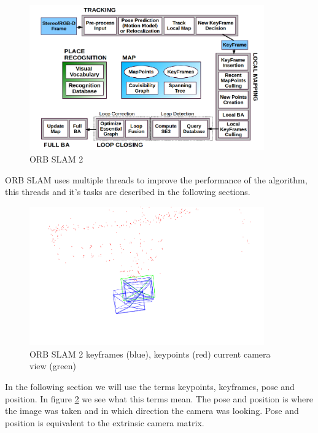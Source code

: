 \documentclass[11pt,a4paper,titlepage,oneside]{report}
\begin{document}
\begin{figure}[H]
  \begin{center}
		\includegraphics[width=0.9\textwidth]{img/orb_slam2.png}
  \end{center}
	\caption{ORB SLAM 2 \cite{orbslam2}}\label{fig:orb_slam2}
\end{figure}

ORB SLAM uses multiple threads to improve the performance of the algorithm, this threads and it's tasks are described in the following sections.

\begin{figure}[H]
  \begin{center}
		\includegraphics[width=0.9\textwidth]{img/pose_map.png}
  \end{center}
	\caption{ORB SLAM 2 keyframes (blue), keypoints (red) current camera view (green)}\label{fig:pose_map}
\end{figure}

In the following section we will use the terms keypoints, keyframes, pose and position. In figure \ref{fig:pose_map} we see what this terms mean. The pose and position is where the image was taken and in which direction the camera was looking. Pose and position is equivalent to the extrinsic camera matrix.
\end{document}
